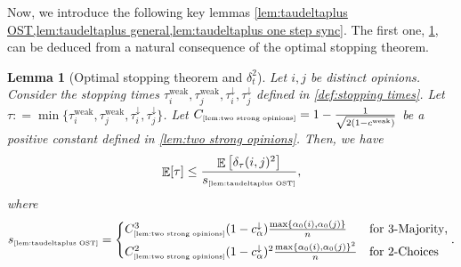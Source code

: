 \documentclass[letterpaper,11pt]{article}
\newtheorem{lemma}[theorem]{Lemma}
\def\defeq{\mathrel{\mathop:}=}
\newcommand{\indicator}{\mathbf{1}}
\DeclareMathOperator*{\E}{\mathbb{E}}
\DeclareMathOperator*{\Var}{\mathbf{Var}}
\newcommand{\constref}[1]{C_{\mbox{\tiny\ref{#1}}}}
\newcommand{\varianceref}[1]{\variance_{\mbox{\tiny\ref{#1}}}}
\newcommand{\cweak}{c^{\mathrm{weak}}}
\newcommand{\calphadown}{c^{\downarrow}_\alpha}
\newcommand{\variance}{s}
\newcommand{\tauidown}{\tau^{\downarrow}_i}
\newcommand{\tauiweak}{\tau^{\mathrm{weak}}_i}
\newcommand{\taujweak}{\tau^{\mathrm{weak}}_j}
\newcommand{\taujdown}{\tau^{\downarrow}_j}
\begin{document}
Now, we introduce the following key lemmas \cref{lem:taudeltaplus OST,lem:taudeltaplus general,lem:taudeltaplus one step sync}.
The first one, \cref{lem:taudeltaplus OST}, can be deduced from a natural consequence of the optimal stopping theorem.
\begin{lemma}[Optimal stopping theorem and $\delta_t^2$]
    \label{lem:taudeltaplus OST}
    Let $ i,j $ be distinct opinions.
    Consider the stopping times $ \tauiweak,\taujweak,\tauidown,\taujdown $ defined in \cref{def:stopping times}.
    Let $\tau\defeq \min\{\tauiweak,\taujweak,\tauidown,\taujdown\}$.
    Let $\constref{lem:two strong opinions}= 1-\frac{1}{\sqrt{2(1-\cweak)}}$ be a positive constant defined in \cref{lem:two strong opinions}.
    Then, we have
    \[
    \E[\tau]\leq \frac{\E\qty[\delta_\tau(i,j)^2]}{\varianceref{lem:taudeltaplus OST}},
    \]
    where
    \begin{align*}
    \varianceref{lem:taudeltaplus OST}=
    \begin{cases*}
         \constref{lem:two strong opinions}^3(1-\calphadown)\frac{\max\{\alpha_0(i),\alpha_0(j)\}}{n}& \text{for 3-Majority},\\
         \constref{lem:two strong opinions}^2(1-\calphadown)^2\frac{\max\{\alpha_0(i),\alpha_0(j)\}^2}{n}& \text{for 2-Choices}
    \end{cases*}.
    \end{align*}
\end{lemma}
\end{document}
